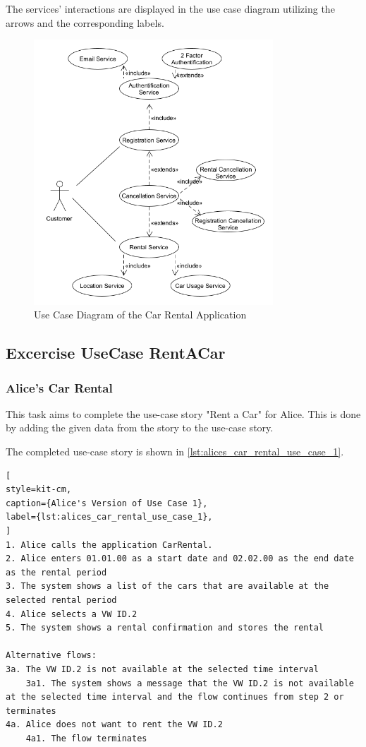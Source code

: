 The services' interactions are displayed in the use case diagram utilizing the arrows and the corresponding labels.
\begin{figure}[H]
    \centering
    \includegraphics[width=0.8\textwidth]{figures/goLang/carRental/carRental_umlDiagram.png}
    \caption{Use Case Diagram of the Car Rental Application}
    \label{fig:car_rental_use_case_diagram}
\end{figure}

\subsection{Excercise UseCase RentACar}
\label{sec:exercise_use_case_rent_a_car}
\subsubsection*{Alice's Car Rental}
This task aims to complete the use-case story "Rent a Car" for Alice.
This is done by adding the given data from the story to the use-case story.

The completed use-case story is shown in \autoref{lst:alices_car_rental_use_case_1}.

\begin{lstlisting}[
style=kit-cm,
caption={Alice's Version of Use Case 1},
label={lst:alices_car_rental_use_case_1},
]
1. Alice calls the application CarRental.
2. Alice enters 01.01.00 as a start date and 02.02.00 as the end date as the rental period
3. The system shows a list of the cars that are available at the selected rental period
4. Alice selects a VW ID.2
5. The system shows a rental confirmation and stores the rental

Alternative flows:
3a. The VW ID.2 is not available at the selected time interval
    3a1. The system shows a message that the VW ID.2 is not available at the selected time interval and the flow continues from step 2 or terminates
4a. Alice does not want to rent the VW ID.2
    4a1. The flow terminates
\end{lstlisting}

